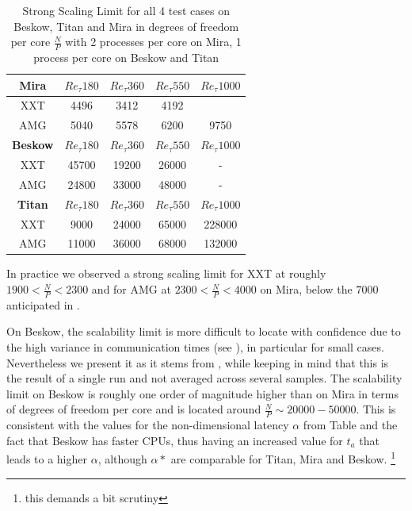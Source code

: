 \documentclass{sig-alternate}
\begin{document}
\begin{table}  
  \caption{Strong Scaling Limit for all 4 test cases on Beskow, Titan and Mira
  in degrees of freedom per core $\frac{N}{P}$ with 2 processes per core on Mira, 1 process per core on Beskow and Titan}
  \centering
  \begin{tabular}{c||cccc}
    \hline
    \hline
    {\bf Mira}
    &$Re_{\tau} 180$&$Re_{\tau} 360$&$Re_{\tau} 550$&$Re_{\tau} 1000$\\
    \hline
    XXT&4496&3412&4192&\\
    AMG&5040&5578&6200&9750\\
    \hline
    \hline
    {\bf Beskow}
    &$Re_{\tau} 180$&$Re_{\tau} 360$&$Re_{\tau} 550$&$Re_{\tau} 1000$\\
    \hline
    XXT&45700&19200&26000& - \\
    AMG&24800&33000&48000& - \\
    \hline
    \hline
    {\bf Titan}
    &$Re_{\tau} 180$&$Re_{\tau} 360$&$Re_{\tau} 550$&$Re_{\tau} 1000$\\
    \hline
    XXT&9000&24000&65000&228000\\
    AMG&11000&36000&68000&132000\\
    \hline
    \hline
  \end{tabular}
  \label{tab:stronglimit}
\end{table}

% 

In practice we observed a strong scaling limit for XXT at roughly $1900<
\frac{N}{P} < 2300$ and for AMG at $2300<\frac{N}{P}<4000$ on Mira, below the $7000$
anticipated in \cite{fischer:scaling}. 

On Beskow, the scalability limit is 
more difficult to locate with confidence due to the high variance in communication times (see ), 
in particular for small cases. Nevertheless we present it as it stems from , while keeping in mind that
this is the result of a single run and not averaged across several samples. The scalability limit on Beskow is roughly one order of magnitude higher than on 
Mira in terms of degrees of freedom per core and is located around 
$\frac{N}{P} \sim 20000 - 50000$. This is consistent with the values for the
non-dimensional latency $\alpha$ %
from Table  
and the fact that Beskow has faster CPUs, thus having an increased value for
$t_a$ that leads to a higher $\alpha$, although $\alpha*$ are comparable for
Titan, Mira and Beskow. \footnote{this demands a bit scrutiny}
\end{document}
